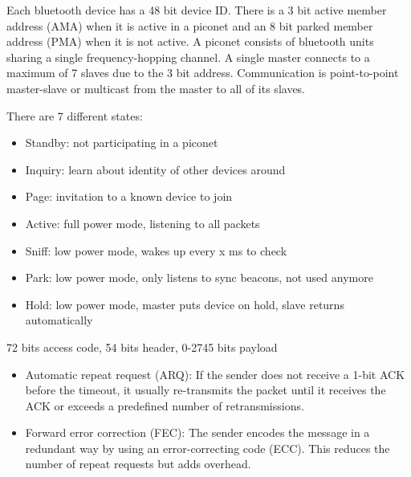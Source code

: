 \begin{mytitle}[Baseband]
    \begin{mysubtitle}[Addressing] Each bluetooth device has a 48 bit device ID. There is a 3 bit active member address (AMA) when it is active in a piconet and an 8 bit parked member address (PMA) when it is not active. A piconet consists of bluetooth units sharing a single frequency-hopping channel. A single master connects to a maximum of 7 slaves due to the 3 bit address. Communication is point-to-point master-slave or multicast from the master to all of its slaves.
    \end{mysubtitle}
    \begin{mysubtitle} There are 7 different states:
    \begin{itemize}
        \item Standby: not participating in a piconet
        \item Inquiry: learn about identity of other devices around
        \item Page: invitation to a known device to join
        \item Active: full power mode, listening to all packets
        \item Sniff: low power mode, wakes up every x ms to check
        \item Park: low power mode, only listens to sync beacons, not used anymore
        \item Hold: low power mode, master puts device on hold, slave returns automatically
    \end{itemize}
    
    \end{mysubtitle}
    \begin{mysubtitle} 72 bits access code, 54 bits header, 0-2745 bits payload
    \end{mysubtitle}
    \begin{mysubtitle}\hfill
    \begin{itemize}
        \item Automatic repeat request (ARQ): If the sender does not receive a 1-bit ACK before the timeout, it usually re-transmits the packet until it receives the ACK or exceeds a predefined number of retransmissions.
        \item Forward error correction (FEC): The sender encodes the message in a redundant way by using an error-correcting code (ECC). This reduces the number of repeat requests but adds overhead.
    \end{itemize}
    \end{mysubtitle}
\end{mytitle}


